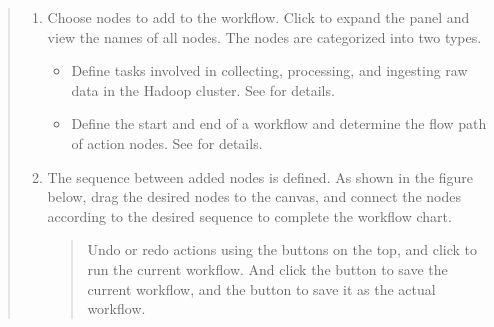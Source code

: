 \documentclass[letterpaper,10pt,english]{sphinxmanual}
\begin{document}
\begin{quote}

\begin{figure}[H]
\centering

\noindent{}
\end{figure}
\begin{enumerate}
\def\theenumi{\arabic{enumi}}
\def\labelenumi{\theenumi .}
\makeatletter\def\p@enumii{\p@enumi \theenumi .}\makeatother
\item {} 
 Choose nodes to add to the workflow. Click  to expand the panel and view the names of all nodes. The nodes are categorized into two types.
\begin{itemize}
\item {} 
 Define tasks involved in collecting, processing, and ingesting raw data in the Hadoop cluster. See {\hyperref[\detokenize{integrator/part03/tasks:action-nodes}]{}} for details.

\item {} 
 Define the start and end of a workflow and determine the flow path of action nodes. See {\hyperref[\detokenize{integrator/part03/control_flow:control-flow-nodes}]{}} for details.

\end{itemize}

\item {} 
 The sequence between added nodes is defined. As shown in the figure below, drag the desired nodes to the canvas, and connect the nodes according to the desired sequence to complete the workflow chart.
\begin{quote}

\begin{figure}[H]
\centering

\noindent{}
\end{figure}

Undo or redo actions using the  buttons on the top, and click  to run the current workflow. And click the  button to save the current workflow, and the  button to save it as the actual workflow.
\end{quote}


\end{enumerate}
\end{quote}
\end{document}
